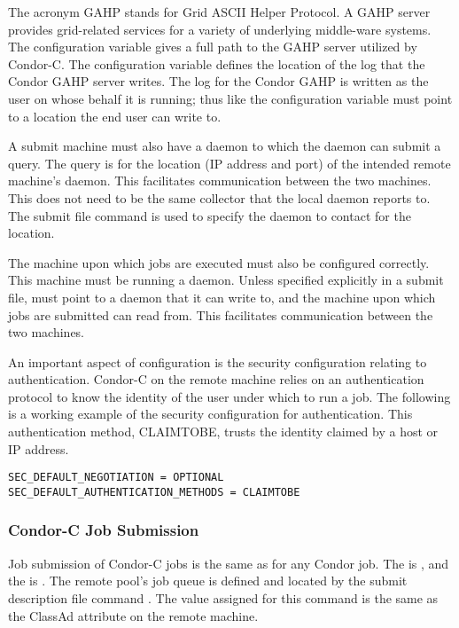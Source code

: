 The acronym GAHP stands for Grid ASCII Helper Protocol.
A GAHP server provides grid-related services for a
variety of underlying middle-ware systems.
The configuration variable 
gives a full path to the GAHP server utilized by Condor-C.
The configuration variable  defines
the location of the log that the Condor GAHP server writes.
The log for the Condor GAHP is written as the user on whose
behalf it is running; thus like  the
 configuration variable must point to a location the end
user can write to.

A submit machine must also have a  daemon to which the
 daemon can submit a query.
The query is for the location (IP address and port)
of the intended remote machine's  daemon.
This facilitates communication between the two machines.
This  does not need to be the same collector
that the local  daemon reports to.
The 
submit file command is used to specify the 
daemon to contact for the location.

The machine upon which jobs are executed 
must also be configured correctly.
This machine must be running a  daemon.
Unless specified explicitly in a submit file, 
 must point to a 
 daemon that it can write to,
and the machine upon which jobs are submitted can read from.
This facilitates communication between the two machines.

An important aspect of configuration is the security 
configuration relating to authentication.
Condor-C on the remote machine relies on an
authentication protocol to
know the identity of the user under which to run a job.
The following is a working example
of the security configuration for authentication.
This authentication method, CLAIMTOBE, 
trusts the identity claimed by a host or IP address.

\footnotesize
\begin{verbatim}
SEC_DEFAULT_NEGOTIATION = OPTIONAL
SEC_DEFAULT_AUTHENTICATION_METHODS = CLAIMTOBE
\end{verbatim}
\normalsize


\subsubsection{\label{sec:Condor-C-Submit}Condor-C Job Submission}
Job submission of Condor-C jobs is the same as for any Condor job.
The  is ,
and the  is . 
The remote pool's job queue is defined and located by
the submit description file command .
The value assigned for this command is the same as
the  ClassAd attribute
 on the remote machine.

